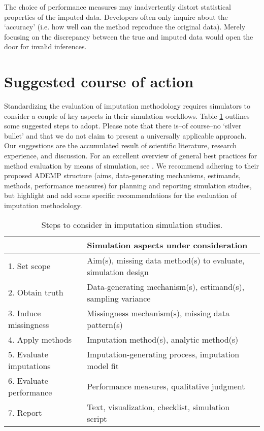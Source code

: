 \documentclass[bimj,fleqn]{w-art}
\begin{document}
The choice of performance measures may inadvertently distort statistical properties of the imputed data. Developers often only inquire about the `accuracy' (i.e. how well can the method reproduce the original data). Merely focusing on the discrepancy between the true and imputed data would open the door for invalid inferences. 



\section{Suggested course of action}

Standardizing the evaluation of imputation methodology requires simulators to consider a couple of key aspects in their simulation workflows. Table \ref{table:steps} outlines some suggested steps to adopt. Please note that there is--of course--no `silver bullet' and that we do not claim to present a universally applicable approach. Our suggestions are the accumulated result of scientific literature, research experience, and discussion. For an excellent overview of general best practices for method evaluation by means of simulation, see \citet{morr18}. We recommend adhering to their proposed ADEMP structure (aims, data-generating mechanisms, estimands, methods, performance measures) for planning and reporting simulation studies, but highlight and add some specific recommendations for the evaluation of imputation methodology.


\begin{table}[tb]
\begin{center}
\caption{Steps to consider in imputation simulation studies.}
\label{table:steps}
\begin{tabular}{lll}
\hline
                        & Simulation aspects under consideration \\
\hline  
1. Set scope            & Aim(s), missing data method(s) to evaluate, simulation design \\
2. Obtain truth         & Data-generating mechanism(s), estimand(s), sampling variance \\
3. Induce missingness   & Missingness mechanism(s), missing data pattern(s) \\
4. Apply methods        & Imputation method(s), analytic method(s) \\
5. Evaluate imputations & Imputation-generating process, imputation model fit \\
6. Evaluate performance & Performance measures, qualitative judgment \\
7. Report               & Text, visualization, checklist, simulation script \\
\hline
\end{tabular}
\end{center}
\end{table}
\end{document}

